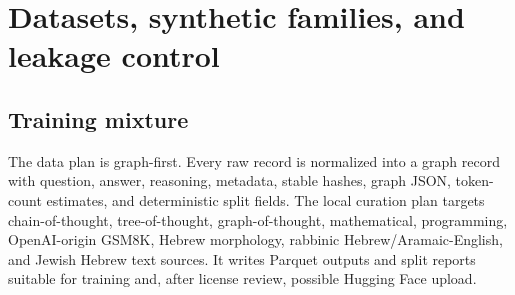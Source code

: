 \documentclass[11pt]{article}
\theoremstyle{definition}
\theoremstyle{plain}
\theoremstyle{remark}
\numberwithin{equation}{section}
\begin{document}
\section{Datasets, synthetic families, and leakage control}

\subsection{Training mixture}

The data plan is graph-first.  Every raw record is normalized into a graph record with question, answer, reasoning, metadata, stable hashes, graph JSON, token-count estimates, and deterministic split fields.  The local curation plan targets chain-of-thought, tree-of-thought, graph-of-thought, mathematical, programming, OpenAI-origin GSM8K, Hebrew morphology, rabbinic Hebrew/Aramaic-English, and Jewish Hebrew text sources.  It writes Parquet outputs and split reports suitable for training and, after license review, possible Hugging Face upload.
\end{document}
